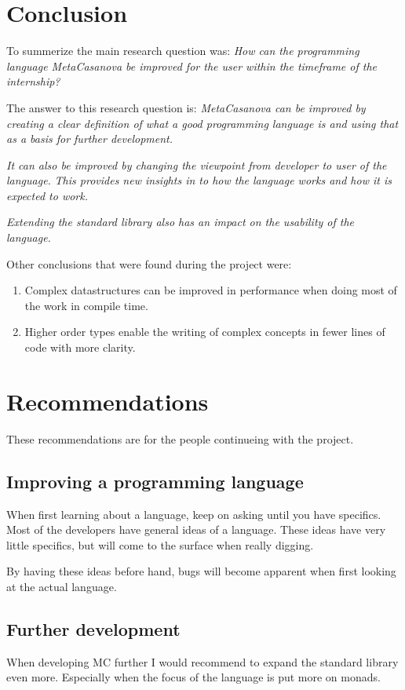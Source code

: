 \chapter{Conclusion}
To summerize the main research question was:
\emph{How can the programming language MetaCasanova be improved for the user within the timeframe of the internship?}

The answer to this research question is:
\emph{MetaCasanova can be improved by creating a clear definition of what a good programming language is and using that as a basis for further development.}

\emph{It can also be improved by changing the viewpoint from developer to user of the language.}
\emph{This provides new insights in to how the language works and how it is expected to work.}

\emph{Extending the standard library also has an impact on the usability of the language.}

Other conclusions that were found during the project were:
\begin{enumerate}
\item Complex datastructures can be improved in performance when doing most of the work in compile time.
\item Higher order types enable the writing of complex concepts in fewer lines of code with more clarity.
\end{enumerate}



\chapter{Recommendations}
These recommendations are for the people continueing with the project.

\section{Improving a programming language}
When first learning about a language, keep on asking until you have specifics.
Most of the developers have general ideas of a language.
These ideas have very little specifics, but will come to the surface when really digging.

By having these ideas before hand, bugs will become apparent when first looking at the actual language.


\section{Further development}
When developing MC further I would recommend to expand the standard library even more.
Especially when the focus of the language is put more on monads.

